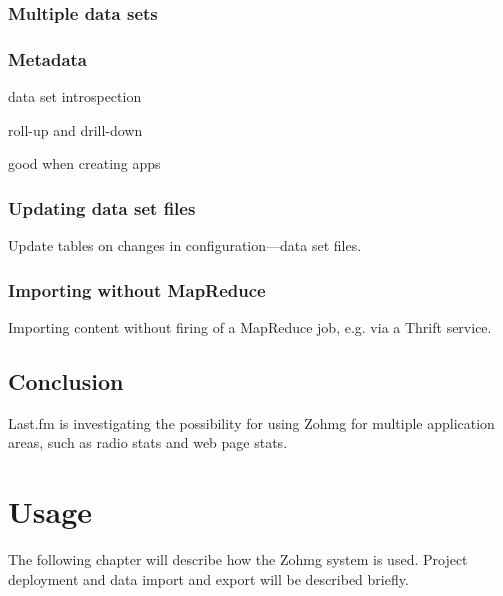 \subsection{Multiple data sets}


\subsection{Metadata}

data set introspection

roll-up and drill-down

good when creating apps


\subsection{Updating data set files}

Update tables on changes in configuration---data set files.


\subsection{Importing without MapReduce}

Importing content without firing of a MapReduce job, e.g. via a Thrift
service.



\section{Conclusion}

Last.fm is investigating the possibility for using Zohmg for multiple
application areas, such as radio stats and web page stats.


\pagebreak



 



\appendix



\chapter{Usage}


\noindent The following chapter will describe how the Zohmg system is used.
Project deployment and data import and export will be described briefly.


